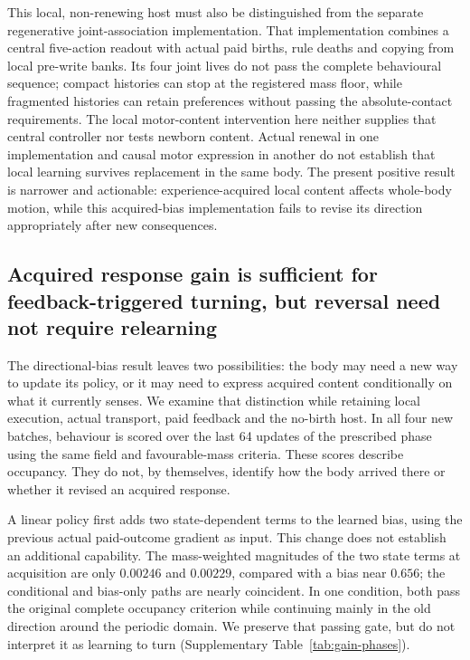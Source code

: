 This local, non-renewing host must also be distinguished from the separate regenerative joint-association implementation. That implementation combines a central five-action readout with actual paid births, rule deaths and copying from local pre-write banks. Its four joint lives do not pass the complete behavioural sequence; compact histories can stop at the registered mass floor, while fragmented histories can retain preferences without passing the absolute-contact requirements. The local motor-content intervention here neither supplies that central controller nor tests newborn content. Actual renewal in one implementation and causal motor expression in another do not establish that local learning survives replacement in the same body. The present positive result is narrower and actionable: experience-acquired local content affects whole-body motion, while this acquired-bias implementation fails to revise its direction appropriately after new consequences.

\subsection*{Acquired response gain is sufficient for feedback-triggered turning, but reversal need not require relearning}

The directional-bias result leaves two possibilities: the body may need a new way to update its policy, or it may need to express acquired content conditionally on what it currently senses. We examine that distinction while retaining local execution, actual transport, paid feedback and the no-birth host. In all four new batches, behaviour is scored over the last 64 updates of the prescribed phase using the same field and favourable-mass criteria. These scores describe occupancy. They do not, by themselves, identify how the body arrived there or whether it revised an acquired response.

A linear policy first adds two state-dependent terms to the learned bias, using the previous actual paid-outcome gradient as input. This change does not establish an additional capability. The mass-weighted magnitudes of the two state terms at acquisition are only $0.00246$ and $0.00229$, compared with a bias near $0.656$; the conditional and bias-only paths are nearly coincident. In one condition, both pass the original complete occupancy criterion while continuing mainly in the old direction around the periodic domain. We preserve that passing gate, but do not interpret it as learning to turn (Supplementary Table~\ref{tab:gain-phases}).

